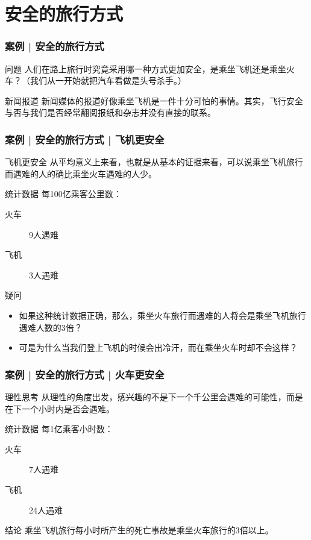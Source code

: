 \section{安全的旅行方式}
\begin{frame}
  \frametitle{案例 | 安全的旅行方式}
  \begin{block}{问题}
    人们在路上旅行时究竟采用哪一种方式更加安全，是乘坐飞机还是乘坐火车？（我们从一开始就把汽车看做是头号杀手。）
  \end{block}
  \pause
  \begin{block}{新闻报道}
    新闻媒体的报道好像乘坐飞机是一件十分可怕的事情。其实，飞行安全与否与我们是否经常翻阅报纸和杂志并没有直接的联系。
  \end{block}
\end{frame}

\begin{frame}
  \frametitle{案例 | 安全的旅行方式 | 飞机更安全}
  \begin{block}{飞机更安全}
    从平均意义上来看，也就是从基本的证据来看，可以说乘坐飞机旅行而遇难的人的确比乘坐火车遇难的人少。
  \end{block}
  \pause
  \begin{block}{统计数据}
    每100亿乘客公里数：
    \begin{description}
      \item[火车] 9人遇难
      \item[飞机] 3人遇难
    \end{description}
  \end{block}
  \pause
  \begin{block}{疑问}
    \begin{itemize}
      \item 如果这种统计数据正确，那么，乘坐火车旅行而遇难的人将会是乘坐飞机旅行遇难人数的3倍？
      \item 可是为什么当我们登上飞机的时候会出冷汗，而在乘坐火车时却不会这样？
    \end{itemize}
  \end{block}
\end{frame}

\begin{frame}
  \frametitle{案例 | 安全的旅行方式 | 火车更安全}
  \begin{block}{理性思考}
    从理性的角度出发，感兴趣的不是下一个千公里会遇难的可能性，而是在下一个小时内是否会遇难。
  \end{block}
  \pause
  \begin{block}{统计数据}
    每1亿乘客小时数：
    \begin{description}
      \item[火车] 7人遇难
      \item[飞机] 24人遇难
    \end{description}
  \end{block}
  \pause
  \begin{block}{结论}
    乘坐飞机旅行每小时所产生的死亡事故是乘坐火车旅行的3倍以上。
  \end{block}
\end{frame}

